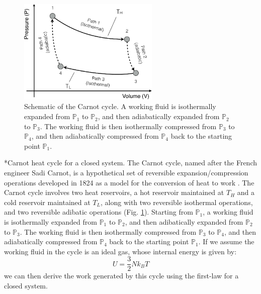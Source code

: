 \documentclass[11pt]{article}
\makeatletter
\theoremstyle{definition}
\renewcommand\subsection{\@startsection
	{subsection}{2}{0mm}
	{-0.05in}
	{-0.5\baselineskip}
	{\normalfont\normalsize\bfseries}}
\makeatother
\begin{document}
\begin{figure}[!ht]\centering
\includegraphics[width=0.6\textwidth]{./figs/CarnotCycle.pdf}
\caption{Schematic of the Carnot cycle. A working fluid is isothermally expanded from $\mathbb{P}_1$ to $\mathbb{P}_2$, and then adiabatically expanded from $\mathbb{P}_2$ to $\mathbb{P}_3$. The working fluid is then isothermally compressed from $\mathbb{P}_3$ to $\mathbb{P}_4$, and then adiabatically compressed from $\mathbb{P}_4$ back to the starting point $\mathbb{P}_1$.}\label{fig-carnot-cycle}
\end{figure}

\subsection*{Carnot heat cycle for a closed system.}
The Carnot cycle, named after the French engineer Sadi Carnot, is a hypothetical set of reversible expansion/compression operations
developed in 1824 as a model for the conversion of heat to work \cite{CARNOT_1824}.
The Carnot cycle involves two heat reservoirs, a hot reservoir maintained at $T_{H}$ and a cold reservoir maintained at $T_{L}$, along with two reversible isothermal operations,
and two reversible adibatic operations (Fig. \ref{fig-carnot-cycle}).
Starting from $\mathbb{P}_{1}$, a working fluid is
isothermally expanded from $\mathbb{P}_{1}$ to $\mathbb{P}_{2}$, and then adibatically expanded from $\mathbb{P}_{2}$ to $\mathbb{P}_{3}$.
The working fluid is then isothermally compressed from $\mathbb{P}_{3}$ to $\mathbb{P}_{4}$, and then adiabatically compressed from $\mathbb{P}_{4}$ back to the starting point $\mathbb{P}_{1}$.
If we assume the working fluid in the cycle is an ideal gas, whose internal energy is given by:
\begin{equation}\label{eqn:internal-energy-for-ideal-gas}
U = \frac{3}{2}Nk_{B}T
\end{equation} we can then derive the work generated by this cycle using the first-law for a closed system.
\end{document}
